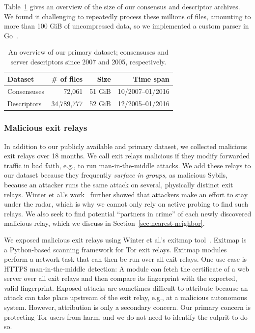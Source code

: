 Table~\ref{tab:collector-dataset} gives an overview of the size of our
consensus and descriptor archives.  We found it challenging to repeatedly
process these millions of files, amounting to more than 100 GiB of uncompressed
data, so we implemented a custom parser in Go~\cite{zoossh}.

\begin{table}[t]
\small
\centering
\begin{tabular}{l r r r}
\toprule
\textbf{Dataset} & \textbf{\# of files} & \textbf{Size} & \textbf{Time span} \\
\midrule
Consensuses & 72,061 & 51 GiB & 10/2007--01/2016 \\
Descriptors & 34,789,777 & 52 GiB & 12/2005--01/2016 \\
\bottomrule
\end{tabular}
\caption{An overview of our primary dataset; consensuses and server descriptors
since 2007 and 2005, respectively.}
\label{tab:collector-dataset}
\end{table}

\subsubsection{Malicious exit relays}
In addition to our publicly available and primary dataset, we collected
malicious exit relays over 18 months.  We call exit relays malicious if they
modify forwarded traffic in bad faith, e.g., to run man-in-the-middle attacks.
We add these relays to our dataset because they frequently \emph{surface in
groups}, as malicious Sybils, because an attacker runs the same attack on
several, physically distinct exit relays.  Winter et al.'s
work~\cite[\S~5.2]{Winter2014a} further showed that attackers make an effort to
stay under the radar, which is why we cannot only rely on active probing to
find such relays.  We also seek to find potential ``partners in crime'' of each
newly discovered malicious relay, which we discuss in
Section~\ref{sec:nearest-neighbor}.

We exposed malicious exit relays using Winter et al.'s exitmap
tool~\cite[\S~3.1]{Winter2014a}.  Exitmap is a Python-based scanning framework
for Tor exit relays.  Exitmap modules perform a network task that can then be
run over all exit relays.  One use case is HTTPS man-in-the-middle detection: A
module can fetch the certificate of a web server over all exit relays and then
compare its fingerprint with the expected, valid fingerprint.  Exposed attacks
are sometimes difficult to attribute because an attack can take place upstream
of the exit relay, e.g., at a malicious autonomous system.  However,
attribution is only a secondary concern.  Our primary concern is protecting Tor
users from harm, and we do not need to identify the culprit to do so.

